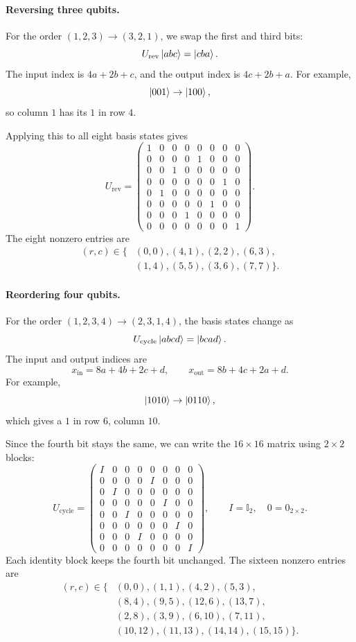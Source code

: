 \documentclass[11pt]{article}
\begin{document}
\paragraph{Reversing three qubits.}
For the order $(1,2,3)\rightarrow(3,2,1)$, we swap
the first and third bits:
\[
U_{\mathrm{rev}}\ket{abc}=\ket{cba}.
\]
The input index is $4a+2b+c$, and the output index
is $4c+2b+a$. For example,
\[
\ket{001}\rightarrow\ket{100},
\]
so column $1$ has its $1$ in row $4$.

Applying this to all eight basis states gives
\[
U_{\mathrm{rev}}=
\begin{pmatrix}
1&0&0&0&0&0&0&0\\
0&0&0&0&1&0&0&0\\
0&0&1&0&0&0&0&0\\
0&0&0&0&0&0&1&0\\
0&1&0&0&0&0&0&0\\
0&0&0&0&0&1&0&0\\
0&0&0&1&0&0&0&0\\
0&0&0&0&0&0&0&1
\end{pmatrix}.
\]
The eight nonzero entries are
\[
\begin{aligned}
(r,c)\in\{&
(0,0),(4,1),(2,2),(6,3),\\
&(1,4),(5,5),(3,6),(7,7)\}.
\end{aligned}
\]

\paragraph{Reordering four qubits.}
For the order $(1,2,3,4)\rightarrow(2,3,1,4)$,
the basis states change as
\[
U_{\mathrm{cycle}}\ket{abcd}=\ket{bcad}.
\]
The input and output indices are
\[
x_{\mathrm{in}}=8a+4b+2c+d,
\qquad
x_{\mathrm{out}}=8b+4c+2a+d.
\]
For example,
\[
\ket{1010}\rightarrow\ket{0110},
\]
which gives a $1$ in row $6$, column $10$.

Since the fourth bit stays the same, we can write
the $16\times16$ matrix using $2\times2$ blocks:
\[
U_{\mathrm{cycle}}=
\begin{pmatrix}
I&0&0&0&0&0&0&0\\
0&0&0&0&I&0&0&0\\
0&I&0&0&0&0&0&0\\
0&0&0&0&0&I&0&0\\
0&0&I&0&0&0&0&0\\
0&0&0&0&0&0&I&0\\
0&0&0&I&0&0&0&0\\
0&0&0&0&0&0&0&I
\end{pmatrix},
\qquad
I=\mathbb{I}_2,\quad 0=0_{2\times2}.
\]
Each identity block keeps the fourth bit unchanged.
The sixteen nonzero entries are
\[
\begin{aligned}
(r,c)\in\{&
(0,0),(1,1),(4,2),(5,3),\\
&(8,4),(9,5),(12,6),(13,7),\\
&(2,8),(3,9),(6,10),(7,11),\\
&(10,12),(11,13),(14,14),(15,15)\}.
\end{aligned}
\]
\end{document}
